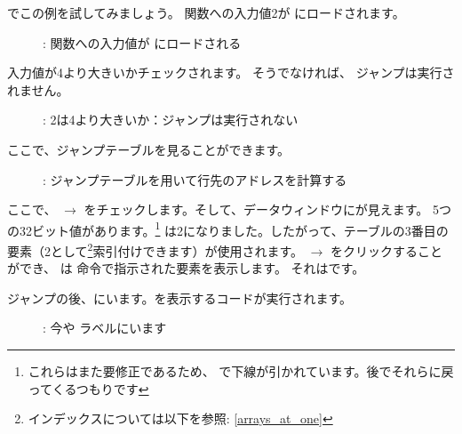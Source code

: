 ﻿\clearpage
\mysubparagraph{\olly}
\myindex{\olly}

\olly でこの例を試してみましょう。
関数への入力値2が \EAX にロードされます。

\begin{figure}[H]
\centering
{}
\caption{\olly: 関数への入力値が \EAX にロードされる}
\label{fig:switch_lot_olly1}
\end{figure}

\clearpage
入力値が4より大きいかチェックされます。
そうでなければ、 ジャンプは実行されません。

\begin{figure}[H]
\centering
{}
\caption{\olly: 2は4より大きいか：ジャンプは実行されない}
\label{fig:switch_lot_olly2}
\end{figure}

\clearpage
ここで、ジャンプテーブルを見ることができます。

\begin{figure}[H]
\centering
{}
\caption{\olly: ジャンプテーブルを用いて行先のアドレスを計算する}
\label{fig:switch_lot_olly3}
\end{figure}

ここで、 $\rightarrow$  をチェックします。そして、データウィンドウにが見えます。
5つの32ビット値があります。\footnote{これらはまた要修正であるため、 \olly で下線が引かれています。後でそれらに戻ってくるつもりです}
\ECX は2になりました。したがって、テーブルの3番目の要素（2として\footnote{インデックスについては以下を参照: \ref{arrays_at_one}}索引付けできます）が使用されます。
 $\rightarrow$ をクリックすることができ、
\olly は \JMP 命令で指示された要素を表示します。
それはです。

\clearpage
ジャンプの後、にいます。を表示するコードが実行されます。

\begin{figure}[H]
\centering
{}
\caption{\olly: 今や  ラベルにいます}
\label{fig:switch_lot_olly4}
\end{figure}
